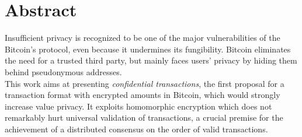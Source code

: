 \chapter{Abstract}
\label{chpr:abstract}
Insufficient privacy is recognized to be one of the major vulnerabilities of the Bitcoin's protocol, even because it undermines its fungibility. Bitcoin eliminates the need for a trusted third party, but mainly faces users' privacy by hiding them behind pseudonymous addresses.\\
This work aims at presenting \textit{confidential transactions}, the first proposal for a transaction format with encrypted amounts in Bitcoin, which would strongly increase value privacy. It exploits homomorphic encryption which does not remarkably hurt universal validation of transactions, a crucial premise for the achievement of a distributed consensus on the order of valid transactions.